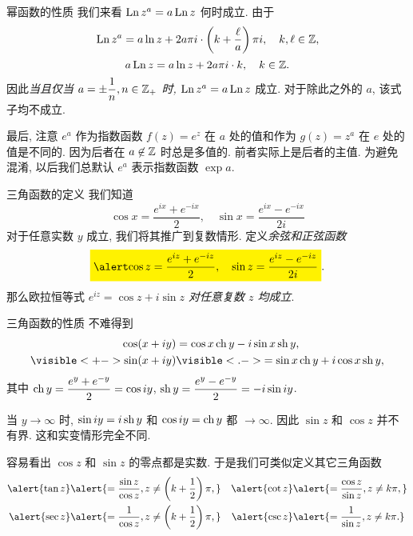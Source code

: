 \begin{frame}{幂函数的性质}
\onslide<+->
我们来看 $\operatorname{Ln} z^a=a\operatorname{Ln} z$ 何时成立.
\onslide<+->
由于
\[\operatorname{Ln} z^a=a\ln z+2a\pi i\cdot\left(k+\frac\ell a\right)\pi i,\quad k,\ell\in{\mathbb{Z}},\]
\vspace{-\baselineskip}
\onslide<+->
\[a\operatorname{Ln} z=a\ln z+2a\pi i\cdot k,\quad k\in{\mathbb{Z}}.\]
\onslide<+->
因此\emph{当且仅当 $a=\pm\dfrac 1n,n\in{\mathbb{Z}}_+$ 时, $\operatorname{Ln} z^a=a\operatorname{Ln} z$} 成立.
\onslide<+->
对于除此之外的 $a$, 该式子均不成立.

\onslide<+->
最后, 注意 $e^a$ 作为指数函数 $f(z)=e^z$ 在 $a$ 处的值和作为 $g(z)=z^a$ 在 $e$ 处的值是\alert{不同}的.
\onslide<+->
因为后者在 $a\not\in{\mathbb{Z}}$ 时总是多值的.
\onslide<+->
前者实际上是后者的主值.
\onslide<+->
为避免混淆, 以后我们总\alert{默认 $e^a$ 表示指数函数 $\exp a$}.
\end{frame}


\begin{frame}{三角函数的定义}
\onslide<+->
我们知道
\[\cos x=\frac{e^{ix}+e^{-ix}}2,\quad
\sin x=\frac{e^{ix}-e^{-ix}}{2i}\]
对于任意实数 $y$ 成立,
\onslide<+->
我们将其推广到复数情形.
\onslide<+->
定义\emph{余弦和正弦函数}
\[\abox{$\displaystyle\cos z=\frac{e^{iz}+e^{-iz}}2,\quad
\sin z=\frac{e^{iz}-e^{-iz}}{2i}$}.\]
\onslide<+->
那么欧拉恒等式 \emph{$e^{iz}=\cos z+i\sin z$ 对任意复数 $z$ 均成立}.
\end{frame}


\begin{frame}{三角函数的性质}
\onslide<+->
不难得到
\begin{align*}
\cos(x+iy)&
=\cos x \ch y-i\sin x\sh y,\\
\visible<+->{\sin(x+iy)}&
\visible<.->{=\sin x\ch y+i\cos x\sh y,}
\end{align*}
\onslide<+->
其中 $\operatorname{ch} y=\dfrac{e^y+e^{-y}}2=\cos{iy}$, $\operatorname{sh} y=\dfrac{e^y-e^{-y}}2=-i\sin{iy}$.

\onslide<+->
当 $y\to\infty$ 时, $\sin iy=i\operatorname{sh} y$ 和 $\cos iy=\operatorname{ch} y$ 都 $\to\infty$.
\onslide<+->
因此 \alert{$\sin z$ 和 $\cos z$ 并不有界}. 
\onslide<+->
这和实变情形完全不同.

\onslide<+->
容易看出 $\cos z$ 和 $\sin z$ 的零点都是实数.
\onslide<+->
于是我们可类似定义其它三角函数
\begin{align*}
\alert{\tan z}&
\alert{=\frac{\sin z}{\cos z},z\neq\left(k+\half\right)\pi,}&
\alert{\cot z}&
\alert{=\frac{\cos z}{\sin z},z\neq k\pi,}\\
\alert{\sec z}&
\alert{=\frac{1}{\cos z},z\neq\left(k+\half\right)\pi,}&
\alert{\csc z}&
\alert{=\frac{1}{\sin z},z\neq k\pi.}
\end{align*}
\end{frame}


